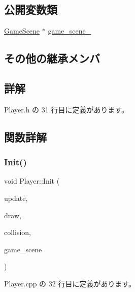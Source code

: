 \subsection*{公開変数類}
\begin{DoxyCompactItemize}
\item 
\mbox{\hyperlink{class_game_scene}{Game\+Scene}} $\ast$ \mbox{\hyperlink{class_player_ab41e7ebf6f975f2eea365923bc2dca7f}{game\+\_\+scene\+\_\+}}
\end{DoxyCompactItemize}
\subsection*{その他の継承メンバ}


\subsection{詳解}


 Player.\+h の 31 行目に定義があります。



\subsection{関数詳解}
\mbox{\label{class_player_a171167a4b1a6dddbe94b8f3c6f7462c4}} 
\subsubsection{\texorpdfstring{Init()}{Init()}}
{\footnotesize\ttfamily void Player\+::\+Init (\begin{DoxyParamCaption}\item[{\mbox{\hyperlink{class_update_base}{Update\+Base}} $\ast$}]{update,  }\item[{\mbox{\hyperlink{class_draw_base}{Draw\+Base}} $\ast$}]{draw,  }\item[{\mbox{\hyperlink{class_collision_base}{Collision\+Base}} $\ast$}]{collision,  }\item[{\mbox{\hyperlink{class_game_scene}{Game\+Scene}} $\ast$}]{game\+\_\+scene }\end{DoxyParamCaption})}



 Player.\+cpp の 32 行目に定義があります。

\mbox{\label{class_player_a457153d0edd58932e37e1356f5fe5fed}} 

